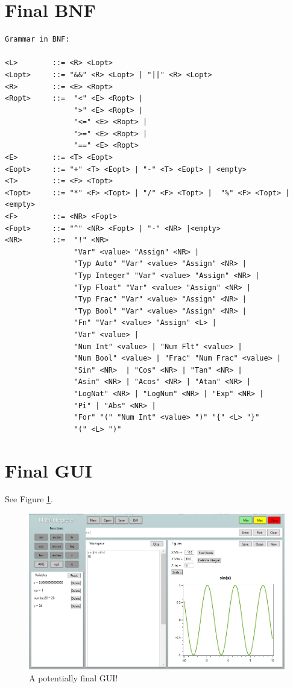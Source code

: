 \documentclass[a4paper, oneside, 11pt]{report}
\begin{document}
    \section{Final BNF}
    \begin{verbatim}
Grammar in BNF:

<L>        ::= <R> <Lopt>
<Lopt>     ::= "&&" <R> <Lopt> | "||" <R> <Lopt>
<R>        ::= <E> <Ropt>
<Ropt>     ::=  "<" <E> <Ropt> |
                ">" <E> <Ropt> |
                "<=" <E> <Ropt> |
                ">=" <E> <Ropt> |
                "==" <E> <Ropt>
<E>        ::= <T> <Eopt>
<Eopt>     ::= "+" <T> <Eopt> | "-" <T> <Eopt> | <empty>
<T>        ::= <F> <Topt>
<Topt>     ::= "*" <F> <Topt> | "/" <F> <Topt> |  "%" <F> <Topt> |<empty>
<F>        ::= <NR> <Fopt>
<Fopt>     ::= "^" <NR> <Fopt> | "-" <NR> |<empty>
<NR>       ::=  "!" <NR>
                "Var" <value> "Assign" <NR> |
                "Typ Auto" "Var" <value> "Assign" <NR> |
                "Typ Integer" "Var" <value> "Assign" <NR> |
                "Typ Float" "Var" <value> "Assign" <NR> |
                "Typ Frac" "Var" <value> "Assign" <NR> |
                "Typ Bool" "Var" <value> "Assign" <NR> |
                "Fn" "Var" <value> "Assign" <L> |
                "Var" <value> |
                "Num Int" <value> | "Num Flt" <value> |
                "Num Bool" <value> | "Frac" "Num Frac" <value> |
                "Sin" <NR>  | "Cos" <NR> | "Tan" <NR> |
                "Asin" <NR> | "Acos" <NR> | "Atan" <NR> |
                "LogNat" <NR> | "LogNum" <NR> | "Exp" <NR> |
                "Pi" | "Abs" <NR> |
                "For" "(" "Num Int" <value> ")" "{" <L> "}"
                "(" <L> ")"
    \end{verbatim}
    \section{Final GUI}

    See Figure \ref{gui02}.

    \begin{figure}[htb]
        \includegraphics[width=0.9 \columnwidth]{GUI_02.png}
        \caption{A potentially final GUI!}
        \label{gui02}
    \end{figure}
\end{document}
